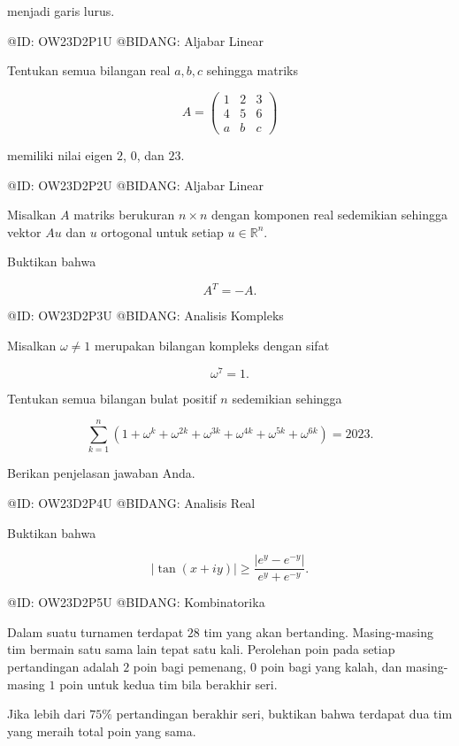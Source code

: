 menjadi garis lurus.

@ID: OW23D2P1U
@BIDANG: Aljabar Linear

Tentukan semua bilangan real $a,b,c$ sehingga matriks

$$
A=
\begin{pmatrix}
1&2&3\\
4&5&6\\
a&b&c
\end{pmatrix}
$$

memiliki nilai eigen $2$, $0$, dan $23$.

@ID: OW23D2P2U
@BIDANG: Aljabar Linear

Misalkan $A$ matriks berukuran $n\times n$ dengan komponen real sedemikian sehingga vektor $Au$ dan $u$ ortogonal untuk setiap $u\in\mathbb R^n$.

Buktikan bahwa

$$
A^T=-A.
$$

@ID: OW23D2P3U
@BIDANG: Analisis Kompleks

Misalkan $\omega\ne1$ merupakan bilangan kompleks dengan sifat

$$
\omega^7=1.
$$

Tentukan semua bilangan bulat positif $n$ sedemikian sehingga

$$
\sum_{k=1}^{n}
\left(
1+\omega^k+\omega^{2k}+\omega^{3k}+\omega^{4k}+\omega^{5k}+\omega^{6k}
\right)
=2023.
$$

Berikan penjelasan jawaban Anda.

@ID: OW23D2P4U
@BIDANG: Analisis Real

Buktikan bahwa

$$
|\tan(x+iy)|
\ge
\frac{|e^y-e^{-y}|}{e^y+e^{-y}}.
$$

@ID: OW23D2P5U
@BIDANG: Kombinatorika

Dalam suatu turnamen terdapat $28$ tim yang akan bertanding. Masing-masing tim bermain satu sama lain tepat satu kali. Perolehan poin pada setiap pertandingan adalah $2$ poin bagi pemenang, $0$ poin bagi yang kalah, dan masing-masing $1$ poin untuk kedua tim bila berakhir seri.

Jika lebih dari $75\%$ pertandingan berakhir seri, buktikan bahwa terdapat dua tim yang meraih total poin yang sama.